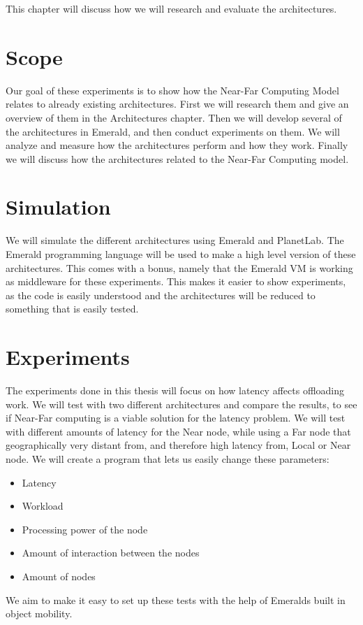 This chapter will discuss how we will research and evaluate the architectures.


\section{Scope}
Our goal of these experiments is to show how the Near-Far Computing Model relates to already existing architectures. First we will research them and give an overview of them in the Architectures chapter. Then we will develop several of the architectures in Emerald, and then conduct experiments on them. We will analyze and measure how the architectures perform and how they work. Finally we will discuss how the architectures related to the Near-Far Computing model.




\section{Simulation}
We will simulate the different architectures using Emerald and PlanetLab. The Emerald programming language will be used to make a high level version of these architectures. This comes with a bonus, namely that the Emerald VM is working as middleware for these experiments. This makes it easier to show experiments, as the code is easily understood and the architectures will be reduced to something that is easily tested.








\section{Experiments}
The experiments done in this thesis will focus on how latency affects offloading work. We will test with two different architectures and compare the results, to see if Near-Far computing is a viable solution for the latency problem. We will test with different amounts of latency for the Near node, while using a Far node that geographically very distant from, and therefore high latency from, Local or Near node. We will create a program that lets us easily change these parameters:
\begin{itemize}
    \item Latency
    \item Workload
    \item Processing power of the node
    \item Amount of interaction between the nodes
    \item Amount of nodes
\end{itemize}
We aim to make it easy to set up these tests with the help of Emeralds built in object mobility.

